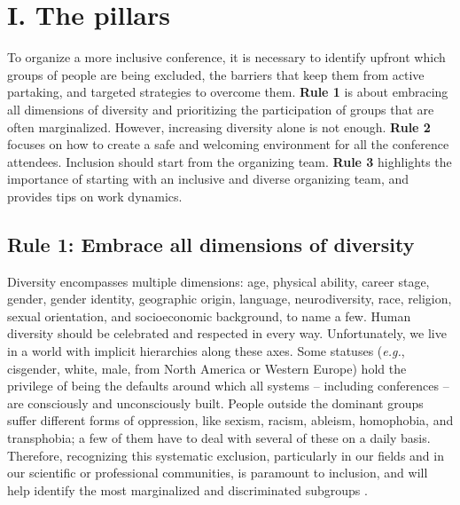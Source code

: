 \documentclass[10pt,letterpaper]{article}
\begin{document}
\section*{I. The pillars}

To organize a more inclusive conference, it is necessary to identify upfront which groups of people are being excluded, the barriers that keep them from active partaking, and targeted strategies to overcome them. 
\textbf{Rule 1} is about embracing all dimensions of diversity and prioritizing the participation of groups that are often marginalized.
However, increasing diversity alone is not enough. \textbf{Rule 2} focuses on how to create a safe and welcoming environment for all the conference attendees. 
Inclusion should start from the organizing team. \textbf{Rule 3} highlights the importance of starting with an inclusive and diverse organizing team, and provides tips on work dynamics.


\subsection*{Rule 1: Embrace all dimensions of diversity}
\label{rule_diversity}

Diversity encompasses multiple dimensions: age, physical ability, career stage, gender, gender identity, geographic origin, language, neurodiversity, race, religion, sexual orientation, and socioeconomic background, to name a few.
Human diversity should be celebrated and respected in every way. 
Unfortunately, we live in a world with implicit hierarchies along these axes. 
Some statuses (\textit{e.g.}, cisgender, white, male, from North America or Western Europe) hold the privilege of being the defaults around which all systems -- including conferences -- are consciously and unconsciously built. 
People outside the dominant groups suffer different forms of oppression, like sexism, racism, ableism, homophobia, and transphobia; a few of them have to deal with several of these on a daily basis.
Therefore, recognizing this systematic exclusion, particularly in our fields and in our scientific or professional communities, is paramount to inclusion, and will help identify the most marginalized and discriminated subgroups \cite{timperleyHeMoanaPukepuke2020}.
\end{document}
